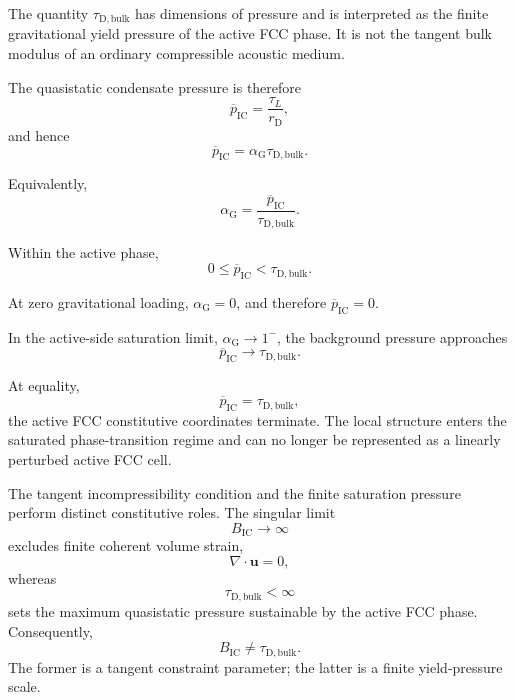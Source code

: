The quantity $\tau_{\mathrm{D,bulk}}$ has dimensions of pressure and is interpreted as the finite gravitational yield pressure of the active FCC phase. It is not the tangent bulk modulus of an ordinary compressible acoustic medium.

The quasistatic condensate pressure is therefore
\begin{equation}
    \overline{p}_{\mathrm{IC}} = \frac{\tau_L}{r_{\mathrm{D}}},
\end{equation}
and hence
\begin{equation}
    \overline{p}_{\mathrm{IC}} = \alpha_{\mathrm{G}}\tau_{\mathrm{D,bulk}}.
\end{equation}

Equivalently,
\begin{equation}
    \alpha_{\mathrm{G}} = \frac{\overline{p}_{\mathrm{IC}}}{\tau_{\mathrm{D,bulk}}}.
\end{equation}

Within the active phase,
\begin{equation}
    0 \leq \overline{p}_{\mathrm{IC}} < \tau_{\mathrm{D,bulk}}.
\end{equation}

At zero gravitational loading, $\alpha_{\mathrm{G}}=0$, and therefore $\overline{p}_{\mathrm{IC}}=0$.

In the active-side saturation limit, $\alpha_{\mathrm{G}}\rightarrow1^{-}$, the background pressure approaches
\begin{equation}
    \overline{p}_{\mathrm{IC}} \rightarrow \tau_{\mathrm{D,bulk}}.
\end{equation}

At equality,
\begin{equation}
    \overline{p}_{\mathrm{IC}} = \tau_{\mathrm{D,bulk}},
\end{equation}
the active FCC constitutive coordinates terminate. The local structure enters the saturated phase-transition regime and can no longer be represented as a linearly perturbed active FCC cell.

The tangent incompressibility condition and the finite saturation pressure perform distinct constitutive roles. The singular limit
\begin{equation}
    B_{\mathrm{IC}}\rightarrow\infty
\end{equation}
excludes finite coherent volume strain,
\begin{equation}
    \nabla\cdot\mathbf{u}=0,
\end{equation}
whereas
\begin{equation}
    \tau_{\mathrm{D,bulk}}<\infty
\end{equation}
sets the maximum quasistatic pressure sustainable by the active FCC phase. Consequently,
\begin{equation}
    \boxed{ B_{\mathrm{IC}} \neq \tau_{\mathrm{D,bulk}} }.
\end{equation}
The former is a tangent constraint parameter; the latter is a finite yield-pressure scale.

